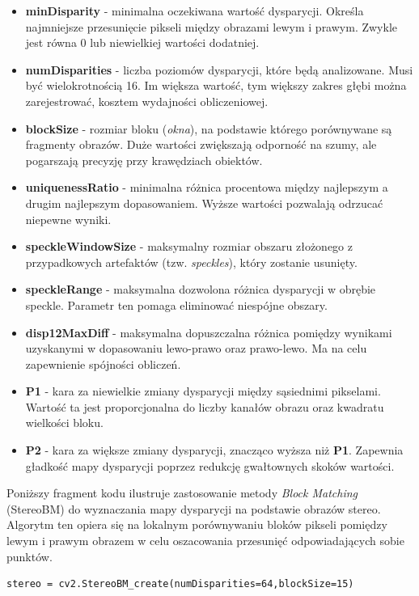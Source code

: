 \documentclass[magisterska]{pracadypl}
\begin{document}
\begin{itemize}
    \item \textbf{minDisparity} - minimalna oczekiwana wartość dysparycji. Określa najmniejsze przesunięcie pikseli między obrazami lewym i prawym. Zwykle jest równa 0 lub niewielkiej wartości dodatniej.
    \item \textbf{numDisparities} - liczba poziomów dysparycji, które będą analizowane. Musi być wielokrotnością 16. Im większa wartość, tym większy zakres głębi można zarejestrować, kosztem wydajności obliczeniowej.
    \item \textbf{blockSize} - rozmiar bloku (\textit{okna}), na podstawie którego porównywane są fragmenty obrazów. Duże wartości zwiększają odporność na szumy, ale pogarszają precyzję przy krawędziach obiektów.
    \item \textbf{uniquenessRatio} - minimalna różnica procentowa między najlepszym a drugim najlepszym dopasowaniem. Wyższe wartości pozwalają odrzucać niepewne wyniki.
    \item \textbf{speckleWindowSize} - maksymalny rozmiar obszaru złożonego z przypadkowych artefaktów (tzw. \textit{speckles}), który zostanie usunięty.
    \item \textbf{speckleRange} - maksymalna dozwolona różnica dysparycji w obrębie speckle. Parametr ten pomaga eliminować niespójne obszary.
    \item \textbf{disp12MaxDiff} - maksymalna dopuszczalna różnica pomiędzy wynikami uzyskanymi w dopasowaniu lewo-prawo oraz prawo-lewo. Ma na celu zapewnienie spójności obliczeń.
    \item \textbf{P1} - kara za niewielkie zmiany dysparycji między sąsiednimi pikselami. Wartość ta jest proporcjonalna do liczby kanałów obrazu oraz kwadratu wielkości bloku.
    \item \textbf{P2} - kara za większe zmiany dysparycji, znacząco wyższa niż \textbf{P1}. Zapewnia gładkość mapy dysparycji poprzez redukcję gwałtownych skoków wartości.
\end{itemize}

Poniższy fragment kodu ilustruje zastosowanie metody \textit{Block Matching} (StereoBM) do wyznaczania mapy dysparycji na podstawie obrazów stereo. Algorytm ten opiera się na lokalnym porównywaniu bloków pikseli pomiędzy lewym i prawym obrazem w celu oszacowania przesunięć odpowiadających sobie punktów.  

\begin{lstlisting}[style=mypython]
stereo = cv2.StereoBM_create(numDisparities=64,blockSize=15)
\end{lstlisting}
\end{document}

